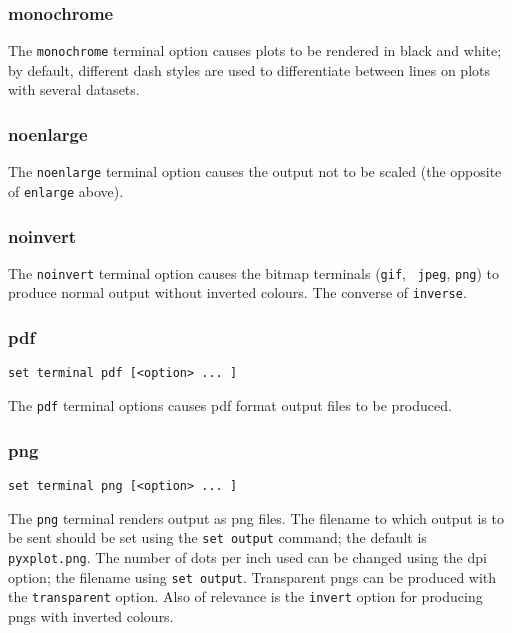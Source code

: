 \documentclass[a4paper,onecolumn,11pt]{book}
\begin{document}
\subsubsection{monochrome}

The {\tt monochrome} terminal option causes plots to be rendered in black and
white; by default, different dash styles are used to differentiate between
lines on plots with several datasets.

\subsubsection{noenlarge}

The {\tt noenlarge} terminal option causes the output not to be scaled (the
opposite of {\tt enlarge} above).

\subsubsection{noinvert}

The {\tt noinvert} terminal option causes the bitmap terminals ({\tt gif}, {\tt
jpeg}, {\tt png}) to produce normal output without inverted colours. The
converse of {\tt inverse}.


\subsubsection{pdf}

\begin{verbatim}
set terminal pdf [<option> ... ]
\end{verbatim}

The {\tt pdf} terminal options causes pdf format output files to be produced.

\subsubsection{png}

\begin{verbatim}
set terminal png [<option> ... ]
\end{verbatim}

The {\tt png} terminal renders output as png files. The filename to which output
is to be sent should be set using the {\tt set output} command; the default is
{\tt pyxplot.png}. The number of dots per inch used can be changed using the dpi
option; the filename using {\tt set output}. Transparent pngs can be produced
with the {\tt transparent} option. Also of relevance is the {\tt invert} option
for producing pngs with inverted colours.
\end{document}

